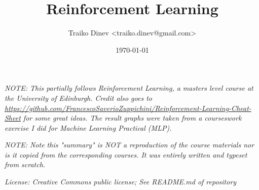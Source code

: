 \documentclass{article}
\title{Reinforcement Learning}
\date{\today}
\author{Traiko Dinev \textless traiko.dinev@gmail.com\textgreater}
\begin{document}
\maketitle
\textit{NOTE: This partially follows Reinforcement Learning, a masters level course at the University of Edinburgh. Credit also goes to \url{https://github.com/FrancescoSaverioZuppichini/Reinforcement-Learning-Cheat-Sheet} for some great ideas. The result graphs were taken from a courseswork exercise I did for Machine Learning Practical (MLP).}

\textit{NOTE: Note this "summary" is NOT a reproduction of the course materials nor is it copied from the corresponding courses. It was entirely written and typeset from scratch.}

\textit{License: Creative Commons public license; See README.md of repository}
\end{document}
